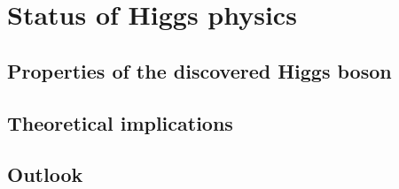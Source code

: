 
\chapter{Status of Higgs physics}
\label{chap:conclusions}

\section{Properties of the discovered Higgs boson}
	\label{sec:searches}
	
\clearpage
\section{Theoretical implications}
	\label{sec:implications}
	
\section{Outlook}
	\label{sec:outlook}
	



